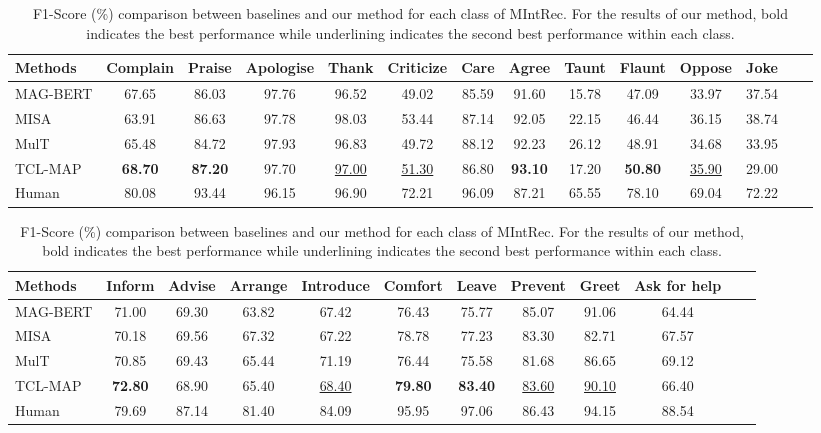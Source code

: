 \documentclass[letterpaper]{article} %
\begin{document}
\begin{table}[t!]
\renewcommand\tabcolsep{3pt}
\centering

\begin{tabular*}{\textwidth}{c|c@{\extracolsep{\fill}}cccccccccccc}
\toprule
\multicolumn{1}{l|}{Methods} &Complain& Praise & Apologise & Thank & Criticize  & Care & Agree & Taunt & Flaunt & Oppose & Joke   \\
\midrule
\multicolumn{1}{l|}{MAG-BERT}  & 67.65 & 86.03 & 97.76 & 96.52 & 49.02 & 85.59 & 91.60 & 15.78 & 47.09 & 33.97 & 37.54 \\
\multicolumn{1}{l|}{MISA}  & 63.91 & 86.63 & 97.78 & 98.03 & 53.44 & 87.14 & 92.05 & 22.15 & 46.44 & 36.15 & 38.74 \\
\multicolumn{1}{l|}{MulT} & 65.48 & 84.72 & 97.93 & 96.83 & 49.72& 88.12 & 92.23 & 26.12 & 48.91 & 34.68 & 33.95 \\
\multicolumn{1}{l|}{TCL-MAP}  & \textbf{68.70} & \textbf{87.20} & 97.70 & \underline{97.00} & \underline{51.30} & 86.80 & \textbf{93.10} & 17.20 & \textbf{50.80} & \underline{35.90} & 29.00 \\
\midrule
\multicolumn{1}{l|}{Human}  & 80.08 & 93.44 & 96.15 & 96.90 & 72.21 & 96.09 & 87.21 & 65.55 & 78.10 & 69.04 & 72.22 \\
\midrule
\end{tabular*}


\begin{tabular*}{\textwidth}{c|c@{\extracolsep{\fill}}cccccccccc}
\midrule
\multicolumn{1}{l|}{Methods} & Inform  &Advise & Arrange & Introduce & Comfort & Leave & Prevent & Greet & Ask for help\\
\midrule
\multicolumn{1}{l|}{MAG-BERT}  & 71.00 & 69.30 & 63.82 & 67.42 & 76.43 & 75.77 & 85.07 & 91.06 & 64.44 \\
\multicolumn{1}{l|}{MISA}  & 70.18 & 69.56 & 67.32 & 67.22 & 78.78 & 77.23 & 83.30 & 82.71 & 67.57 \\
\multicolumn{1}{l|}{MulT} & 70.85  & 69.43 & 65.44 & 71.19 & 76.44 & 75.58 & 81.68 & 86.65 & 69.12  \\
\multicolumn{1}{l|}{TCL-MAP}  & \textbf{72.80} & 68.90 & 65.40 & \underline{68.40} & \textbf{79.80} & \textbf{83.40} & \underline{83.60} & \underline{90.10} & 66.40 \\
\midrule
\multicolumn{1}{l|}{Human}  & 79.69 & 87.14 & 81.40 & 84.09 & 95.95 & 97.06 & 86.43 & 94.15 & 88.54 \\
\bottomrule
\end{tabular*}

\caption{\protect \label{results_each_classes} F1-Score (\%) comparison between baselines and our method for each class of MIntRec. For the results of our method, bold indicates the best performance while underlining indicates the second best performance within each class.
}
\end{table}
\end{document}

